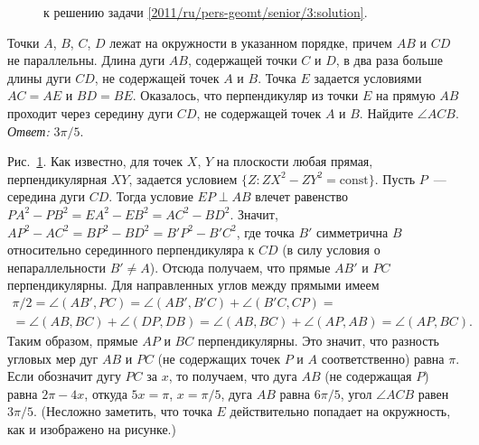\ifsolution
\begin{figure}\centering
    \caption{к решению задачи \ref{2011/ru/pers-geomt/senior/3:solution}.}
    \label{2011/ru/pers-geomt/senior/3:solution:fig}
\end{figure}%
\fi %

\problem
Точки $A$, $B$, $C$, $D$ лежат на окружности в указанном порядке, причем $AB$ и
$CD$ не параллельны.
Длина дуги $AB$, содержащей точки $C$ и $D$, в два раза больше длины дуги $CD$,
не содержащей точек $A$ и $B$.
Точка $E$ задается условиями $AC = AE$ и $BD = BE$.
Оказалось, что перпендикуляр из точки $E$ на прямую $AB$ проходит через
середину дуги $CD$, не содержащей точек $A$ и $B$.
Найдите $\angle ACB$.
\solution
\label{2011/ru/pers-geomt/senior/3:solution}%
\emph{Ответ:} $3 \pi / 5$.
\par
Рис.~\ref{2011/ru/pers-geomt/senior/3:solution:fig}.
Как известно, для точек $X$, $Y$ на плоскости любая прямая, перпендикулярная
$XY$, задается условием
$\{ Z \colon ZX^2 - ZY^2 = \mathrm{const} \}$.
Пусть $P$~--- середина дуги $CD$.
Тогда условие $EP \perp AB$ влечет равенство
$PA^2 - PB^2 = EA^2 - EB^2 = AC^2 - BD^2$.
Значит, $AP^2 - AC^2 = BP^2 - BD^2 = B'P^2 - B'C^2$, где точка $B'$
симметрична $B$ относительно серединного перпендикуляра к $CD$
(в силу условия о непараллельности $B' \neq A$).
Отсюда получаем, что прямые $AB'$ и $PC$ перпендикулярны.
Для направленных углов между прямыми имеем 
\begin{gather*}
    \pi / 2
=
    \angle (AB', PC)
=
    \angle (AB', B'C) + \angle (B'C, CP)
=\\=
    \angle (AB, BC) + \angle (DP, DB)
=
    \angle (AB, BC) + \angle (AP, AB)
=
    \angle (AP, BC)
.\end{gather*}
Таким образом, прямые $AP$ и $BC$ перпендикулярны.
Это значит, что разность угловых мер дуг $AB$ и $PC$
(не содержащих точек $P$ и $A$ соответственно) равна $\pi$.
Если обозначит дугу $PC$ за $x$, то получаем, что дуга $AB$
(не содержащая $P$) равна $2 \pi - 4 x$, откуда $5 x = \pi$, $x = \pi / 5$,
дуга $AB$ равна $6 \pi / 5$, угол $\angle ACB$ равен $3 \pi / 5$.
(Несложно заметить, что точка $E$ действительно попадает на окружность, как и
изображено на рисунке.)
\endproblem
